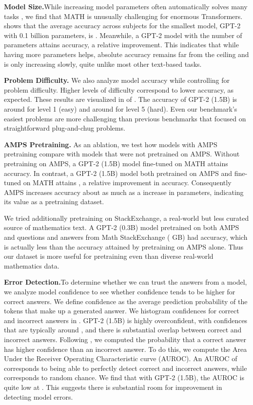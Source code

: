 \documentclass{article}
\begin{document}
\textbf{Model Size.}\quad While increasing model parameters often automatically solves many tasks \citep{Brown2020LanguageMA}, we find that MATH is unusually challenging for enormous Transformers.  shows that the average accuracy across subjects for the smallest model, GPT-2 with 0.1 billion parameters, is . Meanwhile, a GPT-2 model with  the number of parameters attains  accuracy, a  relative improvement. This indicates that while having more parameters helps, absolute accuracy remains far from the ceiling and is only increasing slowly, quite unlike most other text-based tasks. 

\textbf{Problem Difficulty.}\quad
We also analyze model accuracy while controlling for problem difficulty. Higher levels of difficulty correspond to lower accuracy, as expected. These results are visualized in  of . The accuracy of GPT-2 (1.5B) is around  for level 1 (easy) and around  for level 5 (hard). Even our benchmark's easiest problems 
are more challenging than previous benchmarks that focused on straightforward plug-and-chug problems.

\textbf{AMPS Pretraining.}\quad 
As an ablation, we test how models with AMPS pretraining compare with models that were not pretrained on AMPS.
Without pretraining on AMPS, a GPT-2 (1.5B) model fine-tuned on MATH attains  accuracy. In contrast, a GPT-2 (1.5B) model both pretrained on AMPS and fine-tuned on MATH attains , a  relative improvement in accuracy. 
Consequently AMPS increases accuracy about as much as a  increase in parameters, indicating its value as a pretraining dataset.

We tried additionally pretraining on StackExchange, a real-world but less 
curated source of mathematics text. 
A GPT-2 (0.3B) model pretrained on both AMPS and questions and answers from Math StackExchange ( GB) had  accuracy, which is actually less than the  accuracy attained by pretraining on AMPS alone. Thus our dataset is more useful for pretraining even than diverse real-world mathematics data.





\textbf{Error Detection.}\quad To determine whether we can trust the answers from a model, we analyze model confidence to see whether confidence tends to be higher for correct answers. We define confidence as the average prediction probability of the tokens that make up a generated answer. We  histogram confidences for correct and incorrect answers in . GPT-2 (1.5B) is highly overconfident, with confidences that are typically around , and there is substantial overlap between correct and incorrect answers. Following \citet{hendrycks17baseline}, we computed the probability that a correct answer has higher confidence than an incorrect answer. To do this, we compute the Area Under the Receiver Operating Characteristic curve (AUROC). An AUROC of  corresponds to being able to perfectly detect correct and incorrect answers, while  corresponds to random chance. We find that with GPT-2 (1.5B), the AUROC is quite low at . This suggests there is substantial room for improvement in detecting model errors.
\end{document}
